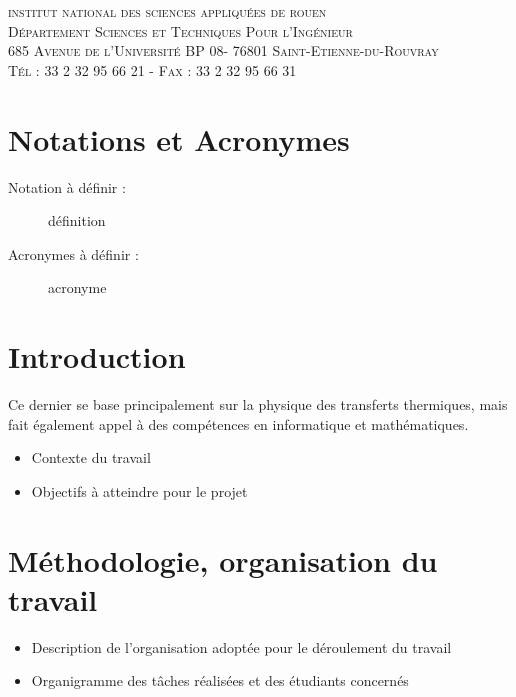 \documentclass[a4paper, 12pt]{report} %
\begin{document}
\vfill
%
\vfill
\begin{center}
  \color{INSA_BLEU}\scshape institut national des sciences appliquées de rouen \\
	Département Sciences et Techniques Pour l'Ingénieur \\
	685 Avenue de l'Université BP 08- 76801 Saint-Etienne-du-Rouvray \\ Tél : 33 2 32 95 66 21 - Fax : 33 2 32 95 66 31
\end{center}
\newpage
\pagestyle{courant} 
	\setcounter{tocdepth}{2}
	\tableofcontents

  
	\chapter*{Notations et Acronymes}		%

\begin{description}
	\item[Notation à définir :] définition
	\item[Acronymes à définir :] acronyme
\end{description}

\newpage
	\chapter*{Introduction}				%
	Ce dernier se base principalement 
	sur la physique des transferts thermiques, mais fait également
	appel à des compétences en informatique et mathématiques. 
	\begin{itemize}
	\item Contexte du travail
	\item Objectifs à atteindre pour le projet
	\end{itemize}

	\chapter{Méthodologie, organisation du travail}

	\begin{itemize}
	\item Description de l’organisation adoptée pour le déroulement du travail
	\item Organigramme des tâches réalisées et des étudiants concernés
	\end{itemize}
\end{document}
